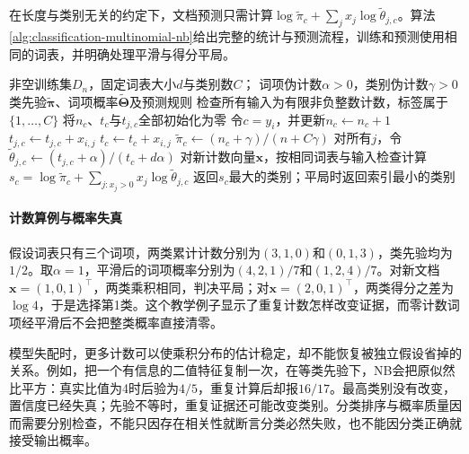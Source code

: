 在长度与类别无关的约定下，文档预测只需计算$\log\tilde\pi_c+\sum_jx_j\log\tilde\theta_{j,c}$。算法\ref{alg:classification-multinomial-nb}给出完整的统计与预测流程，训练和预测使用相同的词表，并明确处理平滑与得分平局。
\begin{algorithm}[带平滑的多项式朴素贝叶斯]
  \label{alg:classification-multinomial-nb}
  \begin{algorithmic}[1]
    \Require 非空训练集$D_n$，固定词表大小$d$与类别数$C$；
    \Statex \hspace{\algorithmicindent} 词项伪计数$\alpha>0$，类别伪计数$\gamma>0$
    \Ensure 类先验$\tilde{\bm{\pi}}$、词项概率$\tilde{\bm{\Theta}}$及预测规则
    \State 检查所有输入为有限非负整数计数，标签属于$\{1,\ldots,C\}$
    \State 将$n_c$、$t_c$与$t_{j,c}$全部初始化为零
      \State 令$c=y_i$，并更新$n_c\gets n_c+1$
        \State $t_{j,c}\gets t_{j,c}+x_{i,j}$
        \State $t_c\gets t_c+x_{i,j}$
      \EndFor
    \EndFor
      \State $\tilde\pi_c\gets(n_c+\gamma)/(n+C\gamma)$
      \State 对所有$j$，令$\tilde\theta_{j,c}\gets(t_{j,c}+\alpha)/(t_c+d\alpha)$
    \EndFor
    \State 对新计数向量$\bm{x}$，按相同词表与输入检查计算
    \Statex \hspace{\algorithmicindent}
      $s_c=\log\tilde\pi_c+\sum_{j:x_j>0}x_j\log\tilde\theta_{j,c}$
    \State 返回$s_c$最大的类别；平局时返回索引最小的类别
  \end{algorithmic}
\end{algorithm}

\paragraph{计数算例与概率失真}
假设词表只有三个词项，两类累计计数分别为$(3,1,0)$和$(0,1,3)$，类先验均为$1/2$。取$\alpha=1$，平滑后的词项概率分别为$(4,2,1)/7$和$(1,2,4)/7$。对新文档$\bm{x}=(1,0,1)^{\top}$，两类乘积相同，判决平局；对$\bm{x}=(2,0,1)^{\top}$，两类得分之差为$\log4$，于是选择第1类。这个教学例子显示了重复计数怎样改变证据，而零计数词项经平滑后不会把整类概率直接清零。

模型失配时，更多计数可以使乘积分布的估计稳定，却不能恢复被独立假设省掉的关系。例如，把一个有信息的二值特征复制一次，在等类先验下，NB会把原似然比平方：真实比值为4时后验为$4/5$，重复计算后却报$16/17$。最高类别没有改变，置信度已经失真；先验不等时，重复证据还可能改变类别。分类排序与概率质量因而需要分别检查，不能只因存在相关性就断言分类必然失败，也不能因分类正确就接受输出概率。

